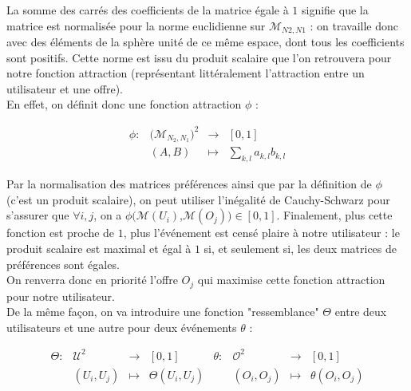 \documentclass[11pt, oneside]{article}
\begin{document}
La somme des carrés des coefficients de la matrice égale à $1$ signifie que la matrice est normalisée pour la norme euclidienne sur $\mathcal{M}_{N2,N1} $ : on travaille donc avec des éléments de la sphère unité de ce même espace, dont tous les coefficients sont positifs. Cette norme est issu du produit scalaire  que l'on retrouvera pour notre fonction attraction (représentant littéralement l'attraction entre un utilisateur et une offre). \\

En effet, on définit donc une fonction attraction $\phi$ :

\begin{center}
\[
\begin{array}{l|rcl}
\phi : & \big( \mathcal{M}_{N_2,N_1} \big)^{2} & \longrightarrow & [0,1] \\
    & (A,B) & \longmapsto & \displaystyle \sum _{k,l} a_{k,l}b_{k,l} \end{array}
\]

\end{center}

Par la normalisation des matrices préférences ainsi que par la définition de $\phi$ (c'est un produit scalaire), on peut utiliser l'inégalité de Cauchy-Schwarz pour s'assurer que $\forall i,j$, on a $\phi (\mathcal{M} (U_i)$,$\mathcal{M} (O_j)) \in [0,1]$. Finalement, plus cette fonction est proche de $1$, plus l'événement est censé plaire à notre utilisateur : le produit scalaire est maximal et égal à $1$ si, et seulement si, les deux matrices de préférences sont égales. \\ On renverra donc en priorité l'offre $O_j$ qui maximise cette fonction attraction pour notre utilisateur.  \\

De la même façon, on va introduire une fonction "ressemblance" $\Theta$ entre deux utilisateurs et une autre pour deux événements $\theta$ :

\begin{center}
\[
\begin{array}{l|rcl}
\Theta : &  \mathcal{U}^{2} & \longrightarrow & [0,1] \\
    & (U_i,U_j) & \longmapsto & \Theta (U_i,U_j) \end{array}
\begin{array}{l|rcl}
\theta : & \mathcal{O}^{2} & \longrightarrow & [0,1] \\
    & (O_i,O_j) & \longmapsto & \theta (O_i,O_j) \end{array}
\]
\end{center}
\end{document}
